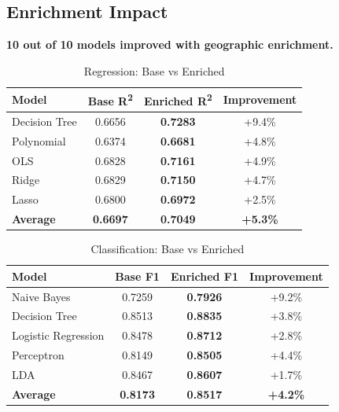 \documentclass[12pt,a4paper]{article}
\begin{document}
\subsection{Enrichment Impact}

\textbf{10 out of 10 models improved with geographic enrichment.}

\begin{table}[H]
\centering
\caption{Regression: Base vs Enriched}
\begin{tabular}{lccc}
\toprule
\textbf{Model} & \textbf{Base R\textsuperscript{2}} & \textbf{Enriched R\textsuperscript{2}} & \textbf{Improvement} \\
\midrule
Decision Tree & 0.6656 & \textbf{0.7283} & +9.4\% \\
Polynomial & 0.6374 & \textbf{0.6681} & +4.8\% \\
OLS & 0.6828 & \textbf{0.7161} & +4.9\% \\
Ridge & 0.6829 & \textbf{0.7150} & +4.7\% \\
Lasso & 0.6800 & \textbf{0.6972} & +2.5\% \\
\midrule
\textbf{Average} & \textbf{0.6697} & \textbf{0.7049} & \textbf{+5.3\%} \\
\bottomrule
\end{tabular}
\end{table}

\begin{table}[H]
\centering
\caption{Classification: Base vs Enriched}
\begin{tabular}{lccc}
\toprule
\textbf{Model} & \textbf{Base F1} & \textbf{Enriched F1} & \textbf{Improvement} \\
\midrule
Naive Bayes & 0.7259 & \textbf{0.7926} & +9.2\% \\
Decision Tree & 0.8513 & \textbf{0.8835} & +3.8\% \\
Logistic Regression & 0.8478 & \textbf{0.8712} & +2.8\% \\
Perceptron & 0.8149 & \textbf{0.8505} & +4.4\% \\
LDA & 0.8467 & \textbf{0.8607} & +1.7\% \\
\midrule
\textbf{Average} & \textbf{0.8173} & \textbf{0.8517} & \textbf{+4.2\%} \\
\bottomrule
\end{tabular}
\end{table}

\newpage

\end{document}
